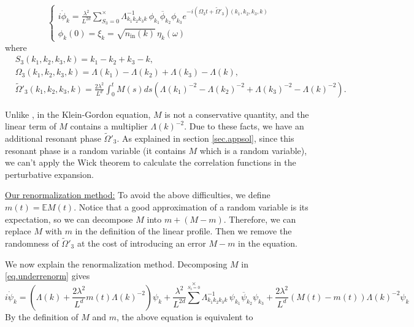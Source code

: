  
 \begin{equation}
\begin{cases}
 i \dot{\phi}_k = \frac{\lambda^2}{L^{2d}} \sum\limits^{\times}_{S_3=0} \Lambda_{k_1k_2k_3k}^{-1}\,\phi_{k_1}\overline{\phi}_{k_2} \phi_{k_3} e^{- i (\Omega_3t+\widetilde{\Omega}'_3)(k_1,k_2,k_3,k)} 
 \\[2em]
\phi_k(0) =\xi_k=\sqrt{n_{\textrm{in}}(k)} \, \eta_{k}(\omega)
\end{cases}
\end{equation}
where 
\begin{equation}
\begin{split}
 &S_3(k_1,k_2,k_3,k) = k_1 - k_2 + k_3 - k,
 \\
 &\Omega_3(k_1,k_2,k_3,k) =\Lambda(k_1)-\Lambda(k_2)+\Lambda(k_3)-\Lambda(k),
 \\
 &\widetilde{\Omega}'_3(k_1,k_2,k_3,k)=\frac{2\lambda^2}{L^{d}} \int^t_{0}M(s) ds\left(\Lambda(k_1)^{-2}-\Lambda(k_2)^{-2}+\Lambda(k_3)^{-2}-\Lambda(k)^{-2}\right).
\end{split}
\end{equation}

Unlike \cite{deng2021derivation}, in the Klein-Gordon equation, $M$ is not a conservative quantity, and the linear term of $M$ contains a multiplier $\Lambda(k)^{-2}$. Due to these facts, we have an additional resonant phase $\widetilde{\Omega}'_3$. As explained in section \ref{sec.appsol}, since this resonant phase is a random variable (it contains $M$ which is a random variable), we can't apply the Wick theorem to calculate the correlation functions in the perturbative expansion.

\underline{Our renormalization method:} To avoid the above difficulties, we define $m(t)=\mathbb{E}M(t)$. Notice that a good approximation of a random variable is its expectation, so we can decompose $M$ into $m+(M-m)$. Therefore, we can replace $M$ with $m$ in the definition of the linear profile. Then we remove the randomness of $\widetilde{\Omega}'_3$ at the cost of introducing an error $M-m$ in the equation. 

We now explain the renormalization method. Decomposing $M$ in \eqref{eq.underrenorm} gives
\begin{equation}\label{eq.underrenorm'}
i \dot{\psi}_{k} 
= \left(\Lambda(k)+\frac{2\lambda^2}{L^{d}} m(t)\Lambda(k)^{-2}\right) \psi_k
+\frac{\lambda^2}{L^{2d}} \sum^{\times}\limits_{S_3=0} \Lambda_{k_1k_2k_3k}^{-1}\,\psi_{k_1}\overline{\psi}_{k_2} \psi_{k_3}+\frac{2\lambda^2}{L^{d}} (M(t)-m(t))\Lambda(k)^{-2} \psi_k
\end{equation}
By the definition of $M$ and $m$, the above equation is equivalent to 

